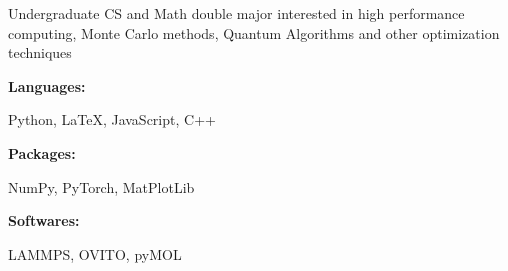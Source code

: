 \documentclass[9pt]{developercv} %
\begin{document}
\begin{minipage}[t]{0.46\textwidth}
	\vspace{-6pt}
	
	Undergraduate CS and Math double major interested in high performance computing, Monte Carlo methods, Quantum Algorithms and other optimization techniques\\
\end{minipage}
\hfill %
\begin{minipage}[t]{0.465\textwidth}
    \vspace{-6pt}
    
    \begin{minipage}[t]{0.2\textwidth}
        \textbf{Languages:}
    \end{minipage}
    \hfill
    \begin{minipage}[t]{0.73\textwidth}
      Python, \LaTeX, JavaScript, C++  
    \end{minipage}
    \vspace{4mm}
    
    \begin{minipage}[t]{0.2\textwidth}
        \textbf{Packages:}
    \end{minipage}
    \hfill
    \begin{minipage}[t]{0.73\textwidth}
      NumPy, PyTorch, MatPlotLib
    \end{minipage}
	\vspace{4mm}
	
	\begin{minipage}[t]{0.2\textwidth}
        \textbf{Softwares:}
    \end{minipage}
    \hfill
    \begin{minipage}[t]{0.73\textwidth}
    LAMMPS, OVITO, pyMOL
    \end{minipage}
    \vspace{1mm}
    
    
\end{minipage}
\end{document}
